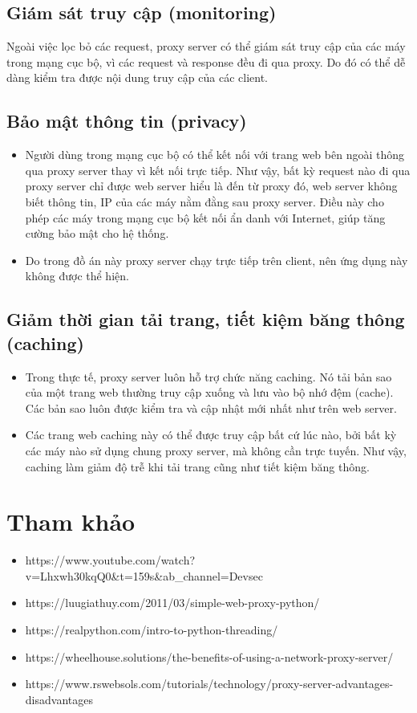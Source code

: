 \documentclass[12pt,a4paper]{article}
\begin{document}
		\subsection{Giám sát truy cập (monitoring)}
			Ngoài việc lọc bỏ các request, proxy server có thể giám sát truy cập của các máy trong mạng cục bộ, vì các request và response đều đi qua proxy. Do đó có thể dễ dàng kiểm tra được nội dung truy cập của các client.
		\subsection{Bảo mật thông tin (privacy)}
			\begin{itemize}
				\item Người dùng trong mạng cục bộ có thể kết nối với trang web bên ngoài thông qua proxy server thay vì kết nối trực tiếp. Như vậy, bất kỳ request nào đi qua proxy server chỉ được web server hiểu là đến từ proxy đó, web server không biết thông tin, IP của các máy nằm đằng sau proxy server. Điều này cho phép các máy trong mạng cục bộ kết nối ẩn danh với Internet, giúp tăng cường bảo mật cho hệ thống.
				\item Do trong đồ án này proxy server chạy trực tiếp trên client, nên ứng dụng này không được thể hiện.
			\end{itemize}
		\subsection{Giảm thời gian tải trang, tiết kiệm băng thông (caching)}
			\begin{itemize}
				\item Trong thực tế, proxy server luôn hỗ trợ chức năng caching. Nó tải bản sao của một trang web thường truy cập xuống và lưu vào bộ nhớ đệm (cache). Các bản sao luôn được kiểm tra và cập nhật mới nhất như trên web server.
				\item Các trang web caching này có thể được truy cập bất cứ lúc nào, bởi bất kỳ các máy nào sử dụng chung proxy server, mà không cần trực tuyến. Như vậy, caching làm giảm độ trễ khi tải trang cũng như tiết kiệm băng thông.
			\end{itemize}
	\section{Tham khảo}
		\begin{itemize}
			\item https://www.youtube.com/watch?v=Lhxwh30kqQ0\&t=159s\&ab\_channel=Devsec
			\item https://luugiathuy.com/2011/03/simple-web-proxy-python/
			\item https://realpython.com/intro-to-python-threading/
			\item https://wheelhouse.solutions/the-benefits-of-using-a-network-proxy-server/
			\item https://www.rswebsols.com/tutorials/technology/proxy-server-advantages-disadvantages
		\end{itemize}
\end{document}
